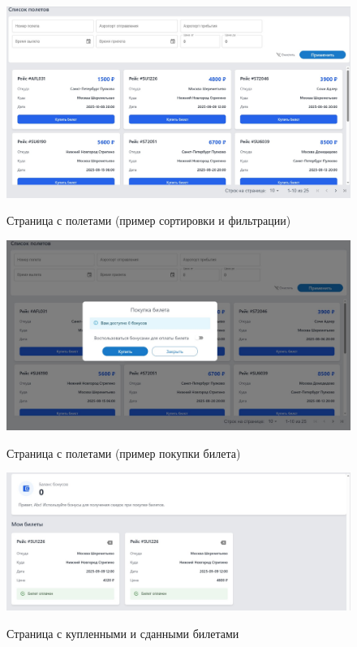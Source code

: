 \begin{figure}[H]
	\begin{center}
		{\includegraphics[scale = 0.35]{img/pages/page-03.jpg}}
		\caption{Страница с полетами (пример сортировки и фильтрации)}
		\label{fig:page-03}
	\end{center}
\end{figure}

\begin{figure}[H]
	\begin{center}
		{\includegraphics[scale = 0.35]{img/pages/page-04.jpg}}
		\caption{Страница с полетами (пример покупки билета)}
		\label{fig:page-04}
	\end{center}
\end{figure}

\begin{figure}[H]
	\begin{center}
		{\includegraphics[scale = 0.4]{img/pages/page-05.jpg}}
		\caption{Страница с купленными и сданными билетами}
		\label{fig:page-05}
	\end{center}
\end{figure}

